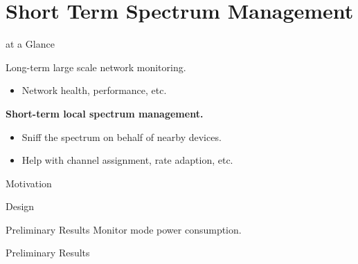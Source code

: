 \section{Short Term Spectrum Management}

\begin{frame}{\PS{} at a Glance}
  \begin{figure}
    \centering
  \end{figure}
  {%
    \color{gray}
    Long-term large scale network monitoring.
    \begin{itemize}
      \item \color{gray} Network health, performance, etc.
    \end{itemize}
  }
  \textbf{Short-term local spectrum management.}
  \begin{itemize}
    \item Sniff the spectrum on behalf of nearby devices.
    \item Help with channel assignment, rate adaption, etc.
  \end{itemize}
\end{frame}

\begin{frame}{Motivation}
\end{frame}

\begin{frame}{\PS{} Design}
\end{frame}

\begin{frame}{Preliminary Results}
  Monitor mode power consumption.
\end{frame}

\begin{frame}{Preliminary Results}
\end{frame}

